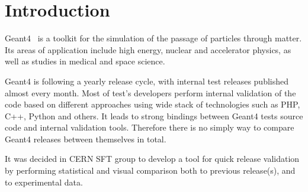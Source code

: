 \section{Introduction}
\label{sec-introduction}
Geant4~\cite{Geant4} is a toolkit for the simulation of the passage of particles through matter. Its areas of application include high energy, nuclear and accelerator physics, as well as studies in medical and space science. 

Geant4 is following a yearly release cycle, with internal test releases published almost every month.
Most of test's developers perform internal validation of the code based on different approaches using wide stack of technologies such as PHP, C++, Python and others.
It leads to strong bindings between Geant4 tests source code and internal validation tools.
Therefore there is no simply way to compare Geant4 releases between themselves in total.

It was decided in CERN SFT group to develop a tool for quick release validation by performing statistical and visual comparison both to previous release(s), and to experimental data. 
%
